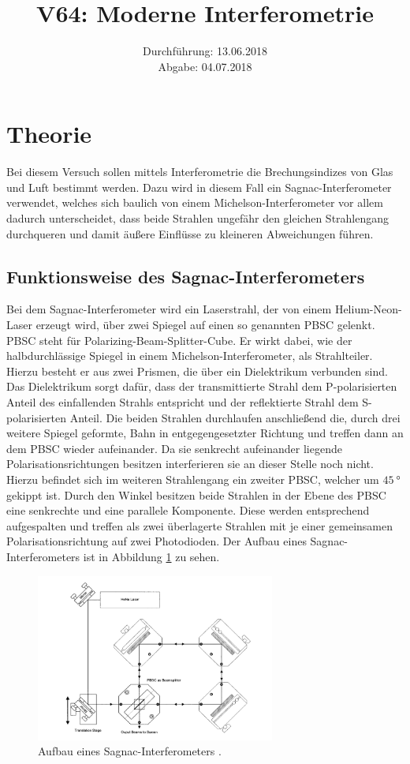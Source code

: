 \documentclass[
  bibliography=totoc,     %
  captions=tableheading,  %
  titlepage=firstiscover, %
]{scrartcl}
\title{V64: Moderne Interferometrie}
\author{
  Simon Schulte
  \texorpdfstring{
    \\
    \href{mailto:simon.schulte@udo.edu}{simon.schulte@udo.edu}
  }{}
  \texorpdfstring{\and}{, }
  Tim Sedlaczek
  \texorpdfstring{
    \\
    \href{mailto:tim.sedlaczek@udo.edu}{tim.sedlaczek@udo.edu}
  }{}
}
\date{Durchführung: 13.06.2018\\
      Abgabe: 04.07.2018}
\begin{document}
\maketitle
\thispagestyle{empty}
\setcounter{page}{1}

\section{Theorie}
\label{sec:theorie}
Bei diesem Versuch sollen mittels Interferometrie die Brechungsindizes von Glas
und Luft bestimmt werden. Dazu wird in diesem Fall ein Sagnac-Interferometer
verwendet, welches sich baulich von einem Michelson-Interferometer vor allem
dadurch unterscheidet, dass beide Strahlen ungefähr den gleichen Strahlengang
durchqueren und damit äußere Einflüsse zu kleineren Abweichungen führen.

\subsection{Funktionsweise des Sagnac-Interferometers}
\label{sub:funktionsweise}
Bei dem Sagnac-Interferometer wird ein Laserstrahl, der von einem Helium-Neon-Laser
erzeugt wird, über zwei Spiegel auf einen so genannten PBSC gelenkt.
PBSC steht für Polarizing-Beam-Splitter-Cube. Er wirkt dabei, wie der
halbdurchlässige Spiegel in einem Michelson-Interferometer, als Strahlteiler.
Hierzu besteht er aus zwei Prismen, die über ein Dielektrikum verbunden sind.
Das Dielektrikum sorgt dafür, dass der transmittierte Strahl dem P-polarisierten
Anteil des einfallenden Strahls entspricht und der reflektierte Strahl dem
S-polarisierten Anteil. Die beiden Strahlen durchlaufen anschließend die, durch
drei weitere Spiegel geformte, Bahn in entgegengesetzter Richtung und treffen dann
an dem PBSC wieder aufeinander. Da sie senkrecht aufeinander liegende Polarisationsrichtungen
besitzen interferieren sie an dieser Stelle noch nicht. Hierzu befindet sich im weiteren
Strahlengang ein zweiter PBSC, welcher um $\SI{45}{\degree}$ gekippt ist. Durch
den Winkel besitzen beide Strahlen in der Ebene des PBSC eine senkrechte und
eine parallele Komponente. Diese werden entsprechend aufgespalten und treffen als
zwei überlagerte Strahlen mit je einer gemeinsamen Polarisationsrichtung
auf zwei Photodioden.
Der Aufbau eines Sagnac-Interferometers ist in Abbildung \ref{fig:1} zu sehen.
\begin{figure}[H]
  \centering
  \includegraphics[width=0.7\textwidth]{Bild1.png}
  \caption{Aufbau eines Sagnac-Interferometers \cite{anleitung}.}
  \label{fig:1}
\end{figure}
\end{document}
